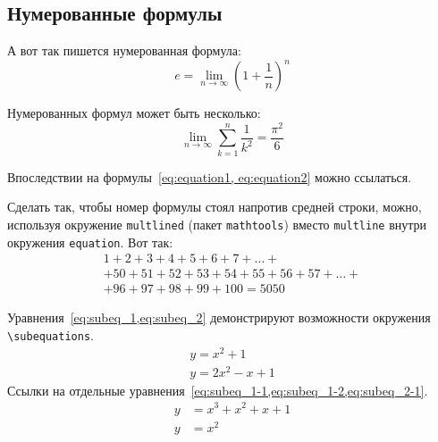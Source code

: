 \subsection{Нумерованные формулы}%

А вот так пишется нумерованная формула:
\begin{equation}
    \label{eq:equation1}
    e = \lim_{n \to \infty} \left( 1+\frac{1}{n} \right) ^n
\end{equation}

Нумерованных формул может быть несколько:
\begin{equation}
    \label{eq:equation2}
    \lim_{n \to \infty} \sum_{k=1}^n \frac{1}{k^2} = \frac{\pi^2}{6}
\end{equation}

Впоследствии на формулы~\cref{eq:equation1, eq:equation2} можно ссылаться.

Сделать так, чтобы номер формулы стоял напротив средней строки, можно,
используя окружение \verb|multlined| (пакет \verb|mathtools|) вместо
\verb|multline| внутри окружения \verb|equation|. Вот так:
\begin{equation} %
    \label{eq:equation3}
    \begin{multlined}
        1+ 2+3+4+5+6+7+\dots + \\
        + 50+51+52+53+54+55+56+57 + \dots + \\
        + 96+97+98+99+100=5050
    \end{multlined}
\end{equation}

Уравнения~\cref{eq:subeq_1,eq:subeq_2} демонстрируют возможности
окружения \verb|\subequations|.
\begin{subequations}
    \label{eq:subeq_1}
    \begin{gather}
        y = x^2 + 1 \label{eq:subeq_1-1} \\
        y = 2 x^2 - x + 1 \label{eq:subeq_1-2}
    \end{gather}
\end{subequations}
Ссылки на отдельные уравнения~\cref{eq:subeq_1-1,eq:subeq_1-2,eq:subeq_2-1}.
\begin{subequations}
    \label{eq:subeq_2}
    \begin{align}
        y & = x^3 + x^2 + x + 1 \label{eq:subeq_2-1} \\
        y & = x^2
    \end{align}
\end{subequations}

